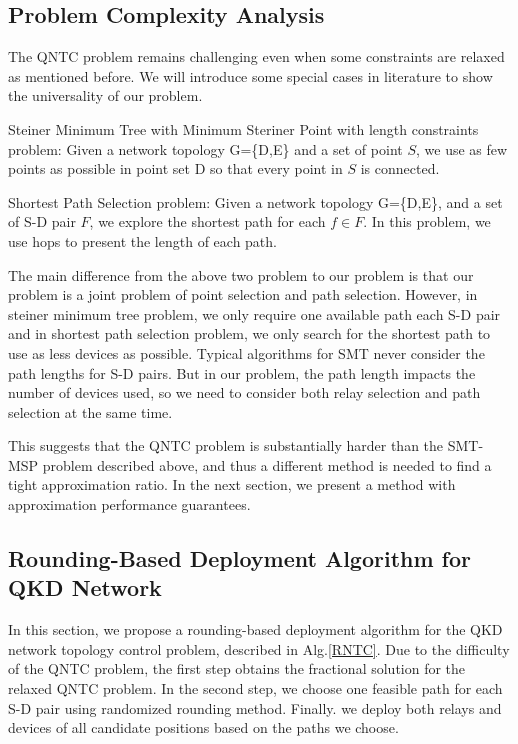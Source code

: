 \subsection{Problem Complexity Analysis}
The QNTC problem remains challenging even when some constraints are relaxed as mentioned before. We will introduce some special cases in literature to show the universality of our problem.


Steiner Minimum Tree with Minimum Steriner Point with length constraints problem: Given a network topology G=\{D,E\} and a set of point $S$, we use as few points as possible in point set D so that every point in $S$ is connected.

Shortest Path Selection problem: Given a network topology G=\{D,E\}, and a set of S-D pair $F$, we explore the shortest path for each $f \in F$. In this problem, we use hops to present the length of each path.

The main difference from the above two problem to our problem is that our problem is a joint problem of point selection and path selection. However, in steiner minimum tree problem, we only require one available path each S-D pair and in shortest path selection problem, we only search for the shortest path to use as less devices as possible. Typical algorithms for SMT never consider the path lengths for S-D pairs. But in our problem, the path length impacts the number of devices used, so we need to consider both relay selection and path selection at the same time.

This suggests that the QNTC problem is substantially harder than the SMT-MSP problem described above, and thus a different method is needed to find a tight approximation ratio. In the next section, we present a method with approximation performance guarantees.


\subsection{Rounding-Based Deployment Algorithm for QKD Network}
In this section, we propose a rounding-based deployment algorithm for the QKD network topology control problem, described in Alg.\ref{RNTC}. Due to the difficulty of the QNTC problem, the first step obtains the fractional solution for the relaxed QNTC problem. In the second step, we choose one feasible path for each S-D pair using randomized rounding method. Finally. we deploy both relays and devices of all candidate positions based on the paths we choose.

